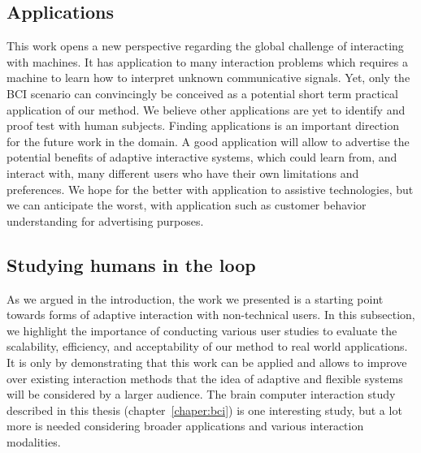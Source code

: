 

\subsection{Applications}

This work opens a new perspective regarding the global challenge of interacting with machines. It has application to many interaction problems which requires a machine to learn how to interpret unknown communicative signals. Yet, only the BCI scenario can convincingly be conceived as a potential short term practical application of our method. We believe other applications are yet to identify and proof test with human subjects. Finding applications is an important direction for the future work in the domain. A good application will allow to advertise the potential benefits of adaptive interactive systems, which could learn from, and interact with, many different users who have their own limitations and preferences. We hope for the better with application to assistive technologies, but we can anticipate the worst, with application such as customer behavior understanding for advertising purposes.

\subsection{Studying humans in the loop}
\label{chapter:limitations:userstudies}


As we argued in the introduction, the work we presented is a starting point towards forms of adaptive interaction with non-technical users. In this subsection, we highlight the importance of conducting various user studies to evaluate the scalability, efficiency, and acceptability of our method to real world applications. It is only by demonstrating that this work can be applied and allows to improve over existing interaction methods that the idea of adaptive and flexible systems will be considered by a larger audience. The brain computer interaction study described in this thesis (chapter~\ref{chaper:bci}) is one interesting study, but a lot more is needed considering broader applications and various interaction modalities.

